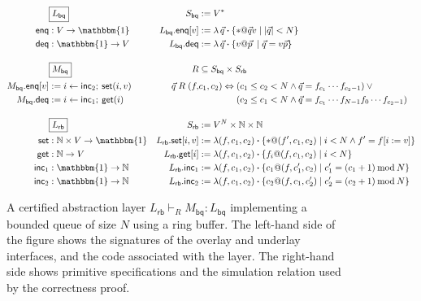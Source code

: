 \documentclass[11pt,oneside]{book}
\theoremstyle{definition}
\newcommand{\kw}[1]{\ensuremath{ \mathsf{#1} }}
\newcommand{\bdot}{\boldsymbol{\cdot}}
\begin{document}
\begin{figure} %
  \small
    \begin{align*}
      & \fbox{$L_\kw{bq}$} &
        S_\kw{bq} &:= V^* \\
      \kw{enq} &: V \rightarrow \mathbbm{1} &
        L_\kw{bq}.\kw{enq}[v] &:=
          \lambda \, \vec{q} \bdot \{ * @ \vec{q} v \mid |\vec{q}| < N \} \\
      \kw{deq} &: \mathbbm{1} \rightarrow V &
        L_\kw{bq}.\kw{deq} &:=
          \lambda \, \vec{q} \bdot \{ v @ \vec{p} \: \mid \vec{q} = v \vec{p} \}
      \\[1em]
      & \fbox{$M_\kw{bq}$} &
        R &\subseteq S_\kw{bq} \times S_\kw{rb} \\
      M_\kw{bq}.\kw{enq}[v] &:= i \leftarrow \kw{inc}_2 ; \: \kw{set}(i, v) \!\!\!\! &
        \vec{q} \mathrel{R} (f, &c_1, c_2) \Leftrightarrow
           (c_1 \le c_2 < N \wedge
            \vec{q} = f_{c_1} \cdots f_{c_2-1}) \vee {}
      \\
      M_\kw{bq}.\kw{deq} &:= i \leftarrow \kw{inc}_1 ; \: \kw{get}(i) &
           &\phantom{c_1, c_2) \Leftrightarrow {}}
           (c_2 \le c_1 < N \wedge
            \vec{q} = f_{c_1} \cdots f_{N-1} f_0 \cdots f_{c_2 - 1})
      \\[1em]
      & \fbox{$L_\kw{rb}$} &
        S_\kw{rb} &:= V^N \times \mathbb{N} \times \mathbb{N}
      \\
      \kw{set} &: \mathbb{N} \times V \rightarrow \mathbbm{1} &
        L_\kw{rb}.\kw{set}[i, v] &:=
          \lambda (f, c_1, c_2) \bdot
          \{ *@(f', c_1, c_2) \mid i < N \wedge f' = f[i := v] \}
      \\
      \kw{get} &: \mathbb{N} \rightarrow V &
        L_\kw{rb}.\kw{get}[i] &:=
          \lambda (f, c_1, c_2) \bdot
          \{ f_i@(f, c_1, c_2) \mid i < N \}
      \\
      \kw{inc}_1 &: \mathbbm{1} \rightarrow \mathbb{N} &
        L_\kw{rb}.\kw{inc}_1 &:=
          \lambda (f, c_1, c_2) \bdot
          \{ c_1@(f, c_1', c_2) \mid
             c_1' = (c_1 + 1) \mathbin{\mathrm{mod}} N \}
      \\
      \kw{inc}_2 &: \mathbbm{1} \rightarrow \mathbb{N} &
        L_\kw{rb}.\kw{inc}_2 &:=
          \lambda (f, c_1, c_2) \bdot
          \{ c_2@(f, c_1, c_2') \mid
             c_2' = (c_2 + 1) \mathbin{\mathrm{mod}} N \}
    \end{align*}
  \caption[Certified abstraction layer implementing a bounded queue]%
   {A certified abstraction layer
    $L_\kw{rb} \vdash_R M_\kw{bq} : L_\kw{bq}$
    implementing a bounded queue of size $N$
    using a ring buffer.
    The left-hand side of the figure shows
    the signatures of the overlay and underlay interfaces,
    and the code associated with the layer.
    The right-hand side shows primitive specifications
    and the simulation relation used by the correctness proof.}
  \label{fig:cal}
\end{figure}
\end{document}
